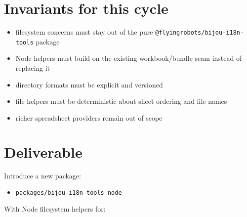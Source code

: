 \section{Invariants for this cycle}\label{record-192-invariants-for-this-cycle}

\begin{itemize}
\tightlist
\item
  filesystem concerns must stay out of the pure \texttt{@\allowbreak{}f\allowbreak{}l\allowbreak{}y\allowbreak{}i\allowbreak{}n\allowbreak{}g\allowbreak{}r\allowbreak{}o\allowbreak{}b\allowbreak{}o\allowbreak{}t\allowbreak{}s\allowbreak{}/\allowbreak{}b\allowbreak{}i\allowbreak{}j\allowbreak{}o\allowbreak{}u\allowbreak{}-\allowbreak{}i\allowbreak{}1\allowbreak{}8\allowbreak{}n\allowbreak{}-\allowbreak{}t\allowbreak{}o\allowbreak{}o\allowbreak{}l\allowbreak{}s} package
\item
  Node helpers must build on the existing workbook/bundle seam instead of replacing it
\item
  directory formats must be explicit and versioned
\item
  file helpers must be deterministic about sheet ordering and file names
\item
  richer spreadsheet providers remain out of scope
\end{itemize}

\section{Deliverable}\label{record-192-deliverable}

Introduce a new package:

\begin{itemize}
\tightlist
\item
  \texttt{p\allowbreak{}a\allowbreak{}c\allowbreak{}k\allowbreak{}a\allowbreak{}g\allowbreak{}e\allowbreak{}s\allowbreak{}/\allowbreak{}b\allowbreak{}i\allowbreak{}j\allowbreak{}o\allowbreak{}u\allowbreak{}-\allowbreak{}i\allowbreak{}1\allowbreak{}8\allowbreak{}n\allowbreak{}-\allowbreak{}t\allowbreak{}o\allowbreak{}o\allowbreak{}l\allowbreak{}s\allowbreak{}-\allowbreak{}n\allowbreak{}o\allowbreak{}d\allowbreak{}e}
\end{itemize}

With Node filesystem helpers for:

